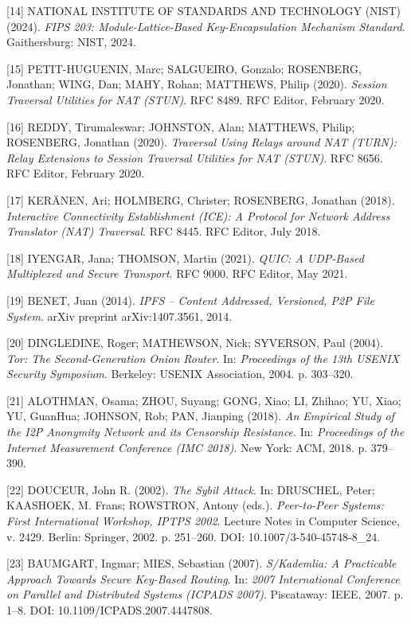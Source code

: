 \documentclass[12pt,a4paper]{article}
\begin{document}
[14] NATIONAL INSTITUTE OF STANDARDS AND TECHNOLOGY (NIST) (2024). \textit{FIPS 203: Module-Lattice-Based Key-Encapsulation Mechanism Standard}. Gaithersburg: NIST, 2024.

[15] PETIT-HUGUENIN, Marc; SALGUEIRO, Gonzalo; ROSENBERG, Jonathan; WING, Dan; MAHY, Rohan; MATTHEWS, Philip (2020).
\textit{Session Traversal Utilities for NAT (STUN)}.
RFC 8489. RFC Editor, February 2020.

[16] REDDY, Tirumaleswar; JOHNSTON, Alan; MATTHEWS, Philip; ROSENBERG, Jonathan (2020).
\textit{Traversal Using Relays around NAT (TURN): Relay Extensions to Session Traversal Utilities for NAT (STUN)}.
RFC 8656. RFC Editor, February 2020.

[17] KER\"ANEN, Ari; HOLMBERG, Christer; ROSENBERG, Jonathan (2018).
\textit{Interactive Connectivity Establishment (ICE): A Protocol for Network Address Translator (NAT) Traversal}.
RFC 8445. RFC Editor, July 2018.

[18] IYENGAR, Jana; THOMSON, Martin (2021).
\textit{QUIC: A UDP-Based Multiplexed and Secure Transport}.
RFC 9000. RFC Editor, May 2021.

[19] BENET, Juan (2014).
\textit{IPFS -- Content Addressed, Versioned, P2P File System}.
arXiv preprint arXiv:1407.3561, 2014.

[20] DINGLEDINE, Roger; MATHEWSON, Nick; SYVERSON, Paul (2004).
\textit{Tor: The Second-Generation Onion Router}.
In: \textit{Proceedings of the 13th USENIX Security Symposium}.
Berkeley: USENIX Association, 2004. p. 303--320.

[21] ALOTHMAN, Osama; ZHOU, Suyang; GONG, Xiao; LI, Zhihao; YU, Xiao; YU, GuanHua; JOHNSON, Rob; PAN, Jianping (2018).
\textit{An Empirical Study of the I2P Anonymity Network and its Censorship Resistance}.
In: \textit{Proceedings of the Internet Measurement Conference (IMC 2018)}.
New York: ACM, 2018. p. 379--390.

[22] DOUCEUR, John R. (2002).
\textit{The Sybil Attack}.
In: DRUSCHEL, Peter; KAASHOEK, M. Frans; ROWSTRON, Antony (eds.).
\textit{Peer-to-Peer Systems: First International Workshop, IPTPS 2002}.
Lecture Notes in Computer Science, v. 2429.
Berlin: Springer, 2002. p. 251--260.
DOI: 10.1007/3-540-45748-8\_24.

[23] BAUMGART, Ingmar; MIES, Sebastian (2007).
\textit{S/Kademlia: A Practicable Approach Towards Secure Key-Based Routing}.
In: \textit{2007 International Conference on Parallel and Distributed Systems (ICPADS 2007)}.
Piscataway: IEEE, 2007. p. 1--8.
DOI: 10.1109/ICPADS.2007.4447808.
\end{document}
